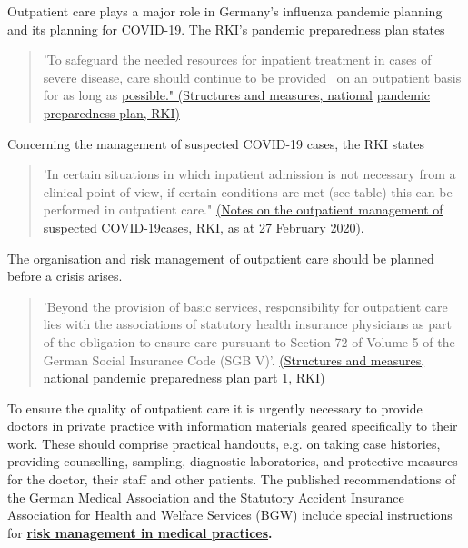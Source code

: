 \documentclass{article}
\begin{document}
Outpatient care plays a major role in Germany's influenza pandemic planning and its planning for COVID-19. The RKI's pandemic preparedness plan states

\begin{quote}



'To safeguard the needed resources for inpatient treatment in cases of severe disease, care should continue to be provided  on an outpatient basis for as long as \href{https://edoc.rki.de/handle/176904/187}{possible." (Structures and measures, national} \href{https://edoc.rki.de/handle/176904/187}{pandemic preparedness plan, RKI)}


\end{quote}


Concerning the management of suspected COVID-19 cases, the RKI states

\begin{quote}



'In certain situations in which inpatient admission is not necessary from a clinical point of view, if certain conditions are met (see table) this can be performed in outpatient care." \href{https://www.rki.de/DE/Content/InfAZ/N/Neuartiges_Coronavirus/ambulant.html}{(Notes on the outpatient management of suspected COVID-19cases, RKI, as at 27 February 2020).}


\end{quote}


The organisation and risk management of outpatient care should be planned before a crisis arises.

\begin{quote}



'Beyond the provision of basic services, responsibility for outpatient care lies with the associations of statutory health insurance physicians as part of the obligation to ensure care pursuant to Section 72 of Volume 5 of the German Social Insurance Code (SGB V)'. \href{https://edoc.rki.de/handle/176904/187}{(Structures and measures, national pandemic preparedness plan} \href{https://edoc.rki.de/handle/176904/187}{part 1, RKI)}


\end{quote}


To ensure the quality of outpatient care it is urgently necessary to provide doctors in private practice with information materials geared specifically to their work. These should comprise practical handouts, e.g. on taking case histories, providing counselling, sampling, diagnostic laboratories, and protective measures for the doctor, their staff and other patients. The published recommendations of the German Medical Association and the Statutory Accident Insurance Association for Health and Welfare Services (BGW) include special instructions for \textbf{\href{https://www.bundesaerztekammer.de/fileadmin/user_upload/downloads/Risikomanagement_in_Arztpraxen.pdf}{risk management in medical practices}}\textbf{.}
\end{document}
